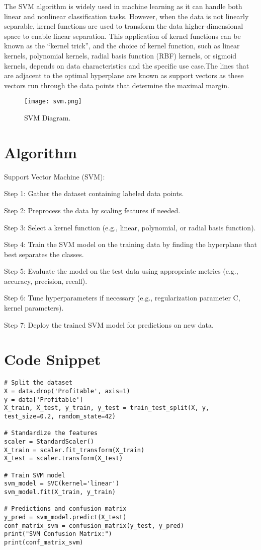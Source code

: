 \documentclass[12pt,a4paper]{report}
\begin{document}
The SVM algorithm is widely used in machine learning as it can handle both linear and nonlinear classification tasks. However, when the data is not linearly separable, kernel functions are used to transform the data higher-dimensional space to enable linear separation. This application of kernel functions can be known as the “kernel trick”, and the choice of kernel function, such as linear kernels, polynomial kernels, radial basis function (RBF) kernels, or sigmoid kernels, depends on data characteristics and the specific use case.The lines that are adjacent to the optimal hyperplane are known as support vectors as these vectors run through the data points that determine the maximal margin.

\begin{figure}
  \centering
\texttt{[image: svm.png]}
  \caption{SVM Diagram.}
\end{figure}
  

\section{Algorithm}
Support Vector Machine (SVM):

Step 1: Gather the dataset containing labeled data points.

Step 2: Preprocess the data by scaling features if needed.

Step 3: Select a kernel function (e.g., linear, polynomial, or radial basis function).

Step 4: Train the SVM model on the training data by finding the hyperplane that best separates the classes.

Step 5: Evaluate the model on the test data using appropriate metrics (e.g., accuracy, precision, recall).

Step 6: Tune hyperparameters if necessary (e.g., regularization parameter C, kernel parameters).

Step 7: Deploy the trained SVM model for predictions on new data.

\section{Code Snippet}
\begin{lstlisting}
# Split the dataset
X = data.drop('Profitable', axis=1)
y = data['Profitable']
X_train, X_test, y_train, y_test = train_test_split(X, y, test_size=0.2, random_state=42)
 
# Standardize the features
scaler = StandardScaler()
X_train = scaler.fit_transform(X_train)
X_test = scaler.transform(X_test)
 
# Train SVM model
svm_model = SVC(kernel='linear')
svm_model.fit(X_train, y_train)
 
# Predictions and confusion matrix
y_pred = svm_model.predict(X_test)
conf_matrix_svm = confusion_matrix(y_test, y_pred)
print("SVM Confusion Matrix:")
print(conf_matrix_svm)

\end{lstlisting}
\clearpage
\end{document}
